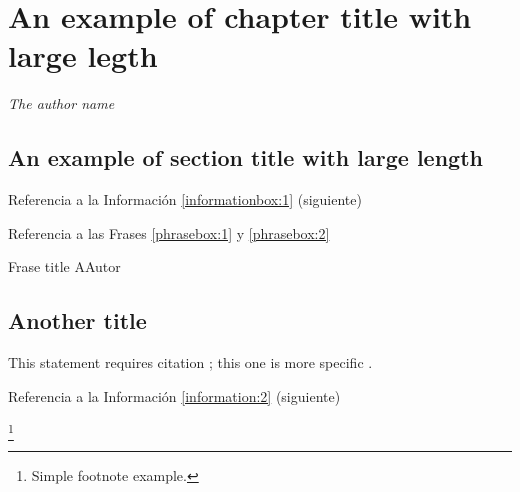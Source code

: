 \chapter{An example of chapter title with large legth}

\begin{phrasebox}{}{\textit{The author name}}
\label{phrasebox:2}
\textit{\lipsum[1][1-3]}
\end{phrasebox}

\vspace{1ex}
\lipsum[1][1-3] 
\section{An example of section title with large length}

\lipsum[1][1-3] 
Referencia a la Información \ref{informationbox:1} (siguiente)

\begin{informationbox}[Título A]
\label{informationbox:1}
\lipsum[1][1-3] 
\end{informationbox}

\lipsum[1]

\lipsum[1][1-3]
Referencia a las Frases \ref{phrasebox:1} y \ref{phrasebox:2} 

\begin{phrasebox}{Frase title A}{Autor}
\label{phrasebox:1}
\lipsum[1][1-2] 
\end{phrasebox}

\lipsum[1][1-3] 

\begin{citationbox}
\lipsum[1][1-3] 
\end{citationbox}

\section{Another title}

This statement requires citation \cite{book_key}; this one is more specific \cite[122]{article_key}.
\lipsum[1][1-4]
 
Referencia a la Información \ref{information:2} (siguiente)

\begin{informationbox}[Título B]
\label{information:2}
\lipsum[1][1-3]\footnote{Simple footnote example.}
\end{informationbox}

